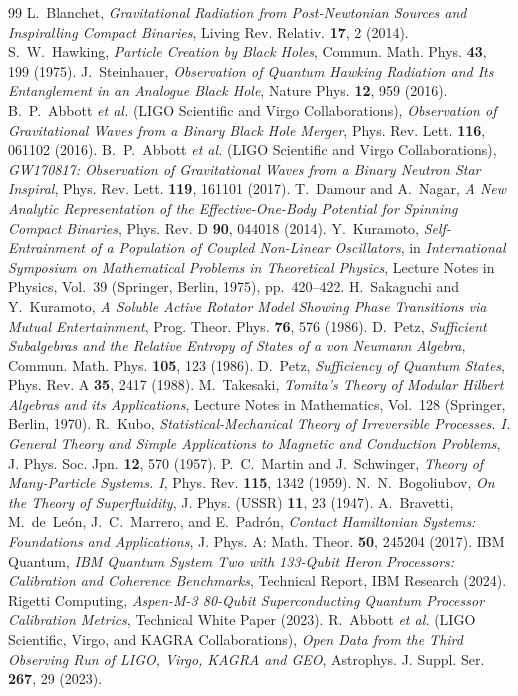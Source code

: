 \documentclass[11pt,a4paper,reqno]{article}
\theoremstyle{definition}
\numberwithin{equation}{section}
\begin{document}
\begin{thebibliography}{99}
 L.~Blanchet, \emph{Gravitational Radiation from Post-Newtonian Sources and Inspiralling Compact Binaries}, Living Rev. Relativ. \textbf{17}, 2 (2014).
 S.~W.~Hawking, \emph{Particle Creation by Black Holes}, Commun. Math. Phys. \textbf{43}, 199 (1975).
 J.~Steinhauer, \emph{Observation of Quantum Hawking Radiation and Its Entanglement in an Analogue Black Hole}, Nature Phys. \textbf{12}, 959 (2016).
 B.~P.~Abbott \textit{et al.} (LIGO Scientific and Virgo Collaborations), \emph{Observation of Gravitational Waves from a Binary Black Hole Merger}, Phys. Rev. Lett. \textbf{116}, 061102 (2016).
 B.~P.~Abbott \textit{et al.} (LIGO Scientific and Virgo Collaborations), \emph{GW170817: Observation of Gravitational Waves from a Binary Neutron Star Inspiral}, Phys. Rev. Lett. \textbf{119}, 161101 (2017).
 T.~Damour and A.~Nagar, \emph{A New Analytic Representation of the Effective-One-Body Potential for Spinning Compact Binaries}, Phys. Rev. D \textbf{90}, 044018 (2014).
 Y.~Kuramoto, \emph{Self-Entrainment of a Population of Coupled Non-Linear Oscillators}, in \emph{International Symposium on Mathematical Problems in Theoretical Physics}, Lecture Notes in Physics, Vol.~39 (Springer, Berlin, 1975), pp.~420--422.
 H.~Sakaguchi and Y.~Kuramoto, \emph{A Soluble Active Rotator Model Showing Phase Transitions via Mutual Entertainment}, Prog. Theor. Phys. \textbf{76}, 576 (1986).
 D.~Petz, \emph{Sufficient Subalgebras and the Relative Entropy of States of a von Neumann Algebra}, Commun. Math. Phys. \textbf{105}, 123 (1986).
 D.~Petz, \emph{Sufficiency of Quantum States}, Phys. Rev. A \textbf{35}, 2417 (1988).
 M.~Takesaki, \emph{Tomita's Theory of Modular Hilbert Algebras and its Applications}, Lecture Notes in Mathematics, Vol.~128 (Springer, Berlin, 1970).
 R.~Kubo, \emph{Statistical-Mechanical Theory of Irreversible Processes. I. General Theory and Simple Applications to Magnetic and Conduction Problems}, J. Phys. Soc. Jpn. \textbf{12}, 570 (1957).
 P.~C.~Martin and J.~Schwinger, \emph{Theory of Many-Particle Systems. I}, Phys. Rev. \textbf{115}, 1342 (1959).
 N.~N.~Bogoliubov, \emph{On the Theory of Superfluidity}, J. Phys. (USSR) \textbf{11}, 23 (1947).
 A.~Bravetti, M.~de~Le\'on, J.~C.~Marrero, and E.~Padr\'on, \emph{Contact Hamiltonian Systems: Foundations and Applications}, J. Phys. A: Math. Theor. \textbf{50}, 245204 (2017).
 IBM Quantum, \emph{IBM Quantum System Two with 133-Qubit Heron Processors: Calibration and Coherence Benchmarks}, Technical Report, IBM Research (2024).
 Rigetti Computing, \emph{Aspen-M-3 80-Qubit Superconducting Quantum Processor Calibration Metrics}, Technical White Paper (2023).
 R.~Abbott \textit{et al.} (LIGO Scientific, Virgo, and KAGRA Collaborations), \emph{Open Data from the Third Observing Run of LIGO, Virgo, KAGRA and GEO}, Astrophys. J. Suppl. Ser. \textbf{267}, 29 (2023).
\end{thebibliography}
\end{document}
